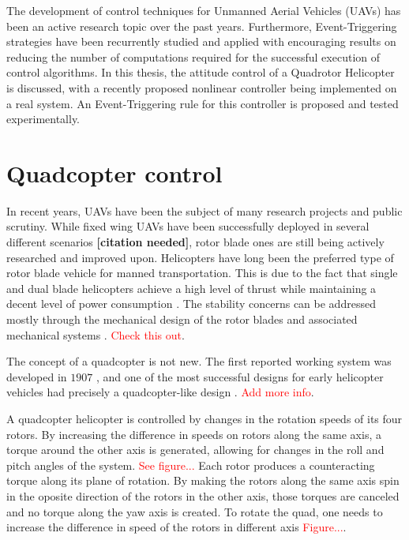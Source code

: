 The development of control techniques for Unmanned Aerial Vehicles (UAVs) has been an active research topic over the past years. Furthermore, Event-Triggering strategies have been recurrently studied and applied with encouraging results on reducing the number of computations required for the successful execution of control algorithms. In this thesis, the attitude control of a Quadrotor Helicopter is discussed, with a recently proposed nonlinear controller being implemented on a real system. An Event-Triggering rule for this controller is proposed and tested experimentally.

\section{Quadcopter control}
	In recent years, UAVs have been the subject of many research projects and public scrutiny. While fixed wing UAVs have been successfully deployed in several different scenarios \textbf{[citation needed]}, rotor blade ones are still being actively researched and improved upon. Helicopters have long been the preferred type of rotor blade vehicle for manned transportation. This is due to the fact that single and dual blade helicopters achieve a high level of thrust while maintaining a decent level of power consumption \cite[pp~3-20]{heli-history}. The stability concerns can be addressed mostly through the mechanical design of the rotor blades and associated mechanical systems \cite{heli-stability}\cite{heli-stability2}.
	\textcolor{red}{Check this out}.

	The concept of a quadcopter is not new. The first reported working system was developed in $1907$ \cite{first-quad}, and one of the most successful designs for early helicopter vehicles had precisely a quadcopter-like design \cite{oemichen-quad}. \textcolor{red}{Add more info}.

	A quadcopter helicopter is controlled by changes in the rotation speeds of its four rotors. By increasing the difference in speeds on rotors along the same axis, a torque around the other axis is generated, allowing for changes in the roll and pitch angles of the system. \textcolor{red}{See figure...} Each rotor produces a counteracting torque along its plane of rotation. By making the rotors along the same axis spin in the oposite direction of the rotors in the other axis, those torques are canceled and no torque along the yaw axis is created. To rotate the quad, one needs to increase the difference in speed of the rotors in different axis \textcolor{red}{Figure...}.

